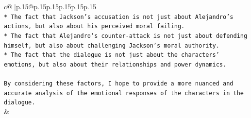 \documentclass{article}
\begin{document}
{\begin{supertabular}{c@{$\;$}|p{.15\linewidth}@{}p{.15\linewidth}p{.15\linewidth}p{.15\linewidth}p{.15\linewidth}p{.15\linewidth}}
{{{\\ 
\texttt{* The fact that Jackson's accusation is not just about Alejandro's actions, but also about his perceived moral failing.} \\
\texttt{* The fact that Alejandro's counter{-}attack is not just about defending himself, but also about challenging Jackson's moral authority.} \\
\texttt{* The fact that the dialogue is not just about the characters' emotions, but also about their relationships and power dynamics.} \\
\\ 
\texttt{By considering these factors, I hope to provide a more nuanced and accurate analysis of the emotional responses of the characters in the dialogue.} \\
            }
        }
    }
    & \\ \\

\end{supertabular}
}
\end{document}
